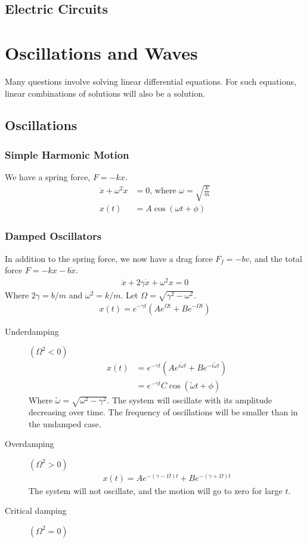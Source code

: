 \documentclass[11pt]{article}
\begin{document}
\begin{multicols*}{3}
\subsection{Electric Circuits}

\section{Oscillations and Waves}
Many questions involve solving linear differential equations. For such equations, linear combinations of solutions will also be a solution.
\subsection{Oscillations}
\subsubsection{Simple Harmonic Motion}
We have a spring force, $F=-kx$.
\begin{align*}
  \ddot{x}+\omega^2x&=0 \text{, where }\omega=\sqrt{\frac{k}{m}}\\
  x(t)&=A \cos(\omega t+\phi)
\end{align*}
\subsubsection{Damped Oscillators}
In addition to the spring force, we now have a drag force $F_f=-bv$, and the total force $F=-kx-b\dot{x}$.
\begin{align*}
  \ddot{x} + 2\gamma\dot{x}+\omega^2x=0
\end{align*}
Where $2\gamma=b/m$ and $\omega^2=k/m$. Let $\Omega = \sqrt{\gamma^2-\omega^2}$.
\begin{align*}
  x(t)=e^{-\gamma t}(Ae^{\Omega t}+Be^{-\Omega t})
\end{align*}
\begin{description}
\item [Underdamping] $(\Omega^2<0)$
  \begin{align*}
    x(t)&=e^{-\gamma t}(Ae^{i\tilde{\omega}t}+Be^{-i\tilde{\omega}t})\\
    &=e^{-\gamma t}C\cos(\tilde{\omega}t + \phi)
  \end{align*}
  Where $\tilde{\omega}=\sqrt{\omega^2-\gamma^2}$. The system will oscillate with its amplitude decreasing over time. The frequency of oscillations will be smaller than in the undamped case.
\item[Overdamping] $(\Omega^2>0)$
  \begin{align*}
    x(t)=Ae^{-(\gamma-\Omega)t}+Be^{-(\gamma+\Omega)t}
  \end{align*}
  The system will not oscillate, and the motion will go to zero for large $t$.
\item[Critical damping] $(\Omega^2=0)$


\end{description}
\end{multicols*}
\end{document}
